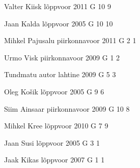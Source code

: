 \documentclass[11pt]{article}
\begin{document}
{Valter Kiisk} %
{lõppvoor} %
{2011} %
{G 10} %
{9} %
{

\ifEngHint
\fi
}

{Jaan Kalda} %
{lõppvoor} %
{2005} %
{G 10} %
{10} %
{

\ifEngHint
\fi
}

{Mihkel Pajusalu} %
{piirkonnavoor} %
{2011} %
{G 2} %
{1} %
{

\ifEngHint
\fi
}

{Urmo Visk} %
{piirkonnavoor} %
{2009} %
{G 1} %
{2} %
{

\ifEngHint
\fi
}

{Tundmatu autor} %
{lahtine} %
{2009} %
{G 5} %
{3} %
{

\ifEngHint
\fi
}

{Oleg Košik} %
{lõppvoor} %
{2005} %
{G 9} %
{6} %
{

\ifEngHint
\fi
}

{Siim Ainsaar} %
{piirkonnavoor} %
{2009} %
{G 10} %
{8} %
{

\ifEngHint
\fi
}

{Mihkel Kree} %
{lõppvoor} %
{2010} %
{G 7} %
{9} %
{

\ifEngHint
\fi
}

{Jaan Susi} %
{lõppvoor} %
{2005} %
{G 3} %
{1} %
{

\ifEngHint
\fi
}

{Jaak Kikas} %
{lõppvoor} %
{2007} %
{G 1} %
{1} %
{

\ifEngHint
\fi
}
\end{document}
